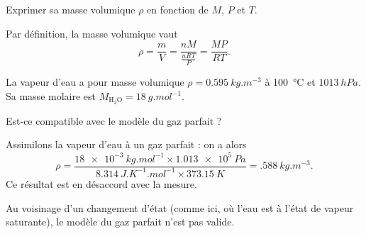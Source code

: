\debutEntrainement


\begin{enonce}
Exprimer sa masse volumique $\rho$ en fonction de $M$, $P$ et $T$.
\end{enonce}


\begin{corrige}
Par définition, la masse volumique vaut 
\[
\rho=\frac{m}{V}=\frac{nM}{\frac{nRT}{P}}=\frac{MP}{RT}.
\]
\end{corrige}




\begin{enonce}
La vapeur d'eau %
 a pour masse volumique $\rho=\SI{0.595}{kg.m^{-3}}$ à \SI{100}{\celsius} et $\SI{1013}{hPa}$. Sa masse molaire est $M_{\mathrm{H_2O}} = \SI{18}{g.mol^{-1}}$. \minusMedskip
  \par
Est-ce compatible avec le modèle du gaz parfait %
 ? 
\end{enonce}


\begin{corrigeNewpage}
Assimilons la vapeur d'eau à un gaz parfait : on a alors 
\[
\rho=\frac{\SI{18e-3}{kg.mol^{-1}} \times \SI{1.013e5}{Pa}} {\SI{8,314}{J.K^{-1}.mol^{-1}} \times \SI{373,15}{K}}=\SI{.588}{kg.m^{-3}}.
\] 
Ce résultat est en désaccord avec la mesure. 

Au voisinage d'un changement d'état (comme ici, où l'eau est à l'état de vapeur saturante), le modèle du gaz parfait n'est pas valide.
\end{corrigeNewpage}


\finEntrainement






